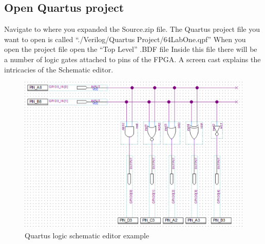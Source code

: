 \documentclass[12pt,journal]{IEEEtran}
\begin{document}
    \subsection{Open Quartus project}
    Navigate to where you expanded the Source.zip file. The Quartus project file you want to open is called
    ``./Verilog/Quartus Project/64LabOne.qpf'' When you open the project file open the ``Top Level'' .BDF file
    Inside this file there will be a number of logic gates attached to pins of the FPGA. A screen cast explains the
    intricacies of the Schematic editor. 
      \begin{figure}[H]
        \includegraphics[width=.48\textwidth]{Images/LogicPreview.png}
        \caption{Quartus logic schematic editor example}
      \end{figure}

\end{document}
